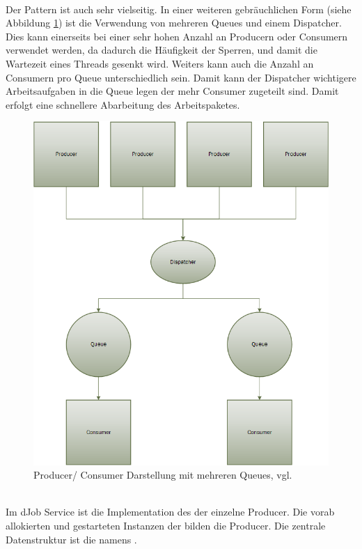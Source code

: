 \\Der Pattern ist auch sehr vielseitig. In einer weiteren gebräuchlichen Form (siehe Abbildung \ref{fig:architecture_2}) ist die Verwendung von mehreren Queues und einem Dispatcher. Dies kann einerseits bei einer sehr hohen Anzahl an Producern oder Consumern verwendet werden, da dadurch die Häufigkeit der Sperren, und damit die Wartezeit eines Threads gesenkt wird. Weiters kann auch die Anzahl an Consumern pro Queue unterschiedlich sein. Damit kann der Dispatcher wichtigere Arbeitsaufgaben in die Queue legen der mehr Consumer zugeteilt sind. Damit erfolgt eine schnellere Abarbeitung des Arbeitspaketes.
\begin{figure}
	\centering
	\includegraphics[width=0.7\linewidth]{images/pc_w_dispatcher}
	\caption{Producer/ Consumer Darstellung mit mehreren Queues, vgl. \parencite[S. 163]{jthreads}}
	\label{fig:architecture_2}
\end{figure}
\\Im dJob Service ist die Implementation des  der einzelne Producer. Die vorab allokierten und gestarteten Instanzen der  bilden die Producer. Die zentrale Datenstruktur ist die  namens .
